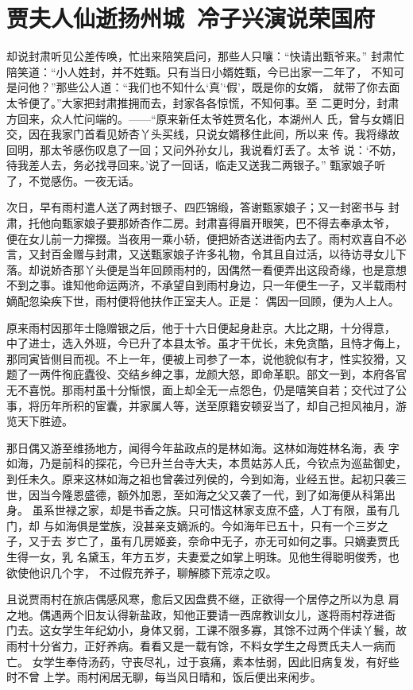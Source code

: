 \chapter{贾夫人仙逝扬州城~冷子兴演说荣国府}

却说封肃听见公差传唤，忙出来陪笑启问，那些人只嚷：“快请出甄爷来。”
封肃忙陪笑道：“小人姓封，并不姓甄。只有当日小婿姓甄，今已出家一二年了，
不知可是问他？”那些公人道：“我们也不知什么‘真’‘假’，既是你的女婿，
就带了你去面太爷便了。”大家把封肃推拥而去，封家各各惊慌，不知何事。至
二更时分，封肃方回来，众人忙问端的。——“原来新任太爷姓贾名化，本湖州人
氏，曾与女婿旧交，因在我家门首看见娇杏丫头买线，只说女婿移住此间，所以来
传。我将缘故回明，那太爷感伤叹息了一回；又问外孙女儿，我说看灯丢了。太爷
说：‘不妨，待我差人去，务必找寻回来。’说了一回话，临走又送我二两银子。”
甄家娘子听了，不觉感伤。一夜无话。

次日，早有雨村遣人送了两封银子、四匹锦缎，答谢甄家娘子；又一封密书与
封肃，托他向甄家娘子要那娇杏作二房。封肃喜得眉开眼笑，巴不得去奉承太爷，
便在女儿前一力撺掇。当夜用一乘小轿，便把娇杏送进衙内去了。雨村欢喜自不必
言，又封百金赠与封肃，又送甄家娘子许多礼物，令其且自过活，以待访寻女儿下
落。却说娇杏那丫头便是当年回顾雨村的，因偶然一看便弄出这段奇缘，也是意想
不到之事。谁知他命运两济，不承望自到雨村身边，只一年便生一子，又半载雨村
嫡配忽染疾下世，雨村便将他扶作正室夫人。正是：
偶因一回顾，便为人上人。

原来雨村因那年士隐赠银之后，他于十六日便起身赴京。大比之期，十分得意，
中了进士，选入外班，今已升了本县太爷。虽才干优长，未免贪酷，且恃才侮上，
那同寅皆侧目而视。不上一年，便被上司参了一本，说他貌似有才，性实狡猾，又
题了一两件徇庇蠹役、交结乡绅之事，龙颜大怒，即命革职。部文一到，本府各官
无不喜悦。那雨村虽十分惭恨，面上却全无一点怨色，仍是嘻笑自若；交代过了公
事，将历年所积的宦囊，并家属人等，送至原籍安顿妥当了，却自己担风袖月，游
览天下胜迹。

那日偶又游至维扬地方，闻得今年盐政点的是林如海。这林如海姓林名海，表
字如海，乃是前科的探花，今已升兰台寺大夫，本贯姑苏人氏，今钦点为巡盐御史，
到任未久。原来这林如海之祖也曾袭过列侯的，今到如海，业经五世。起初只袭三
世，因当今隆恩盛德，额外加恩，至如海之父又袭了一代，到了如海便从科第出身。
虽系世禄之家，却是书香之族。只可惜这林家支庶不盛，人丁有限，虽有几门，却
与如海俱是堂族，没甚亲支嫡派的。今如海年已五十，只有一个三岁之子，又于去
岁亡了，虽有几房姬妾，奈命中无子，亦无可如何之事。只嫡妻贾氏生得一女，乳
名黛玉，年方五岁，夫妻爱之如掌上明珠。见他生得聪明俊秀，也欲使他识几个字，
不过假充养子，聊解膝下荒凉之叹。

且说贾雨村在旅店偶感风寒，愈后又因盘费不继，正欲得一个居停之所以为息
肩之地。偶遇两个旧友认得新盐政，知他正要请一西席教训女儿，遂将雨村荐进衙
门去。这女学生年纪幼小，身体又弱，工课不限多寡，其馀不过两个伴读丫鬟，故
雨村十分省力，正好养病。看看又是一载有馀，不料女学生之母贾氏夫人一病而亡。
女学生奉侍汤药，守丧尽礼，过于哀痛，素本怯弱，因此旧病复发，有好些时不曾
上学。雨村闲居无聊，每当风日晴和，饭后便出来闲步。

